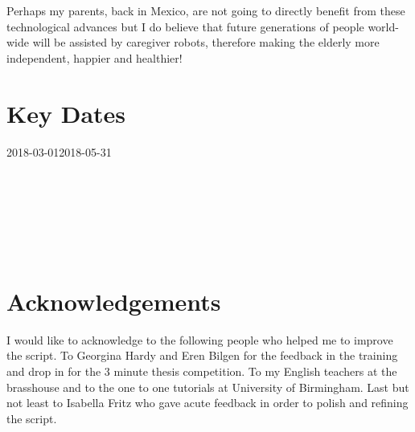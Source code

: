 \documentclass[12pt]{article}
\begin{document}
Perhaps my parents, back in Mexico, are not going to directly benefit 
from these technological advances 
but I do believe that 
future generations of people world-wide
will be assisted by caregiver robots,
therefore making the elderly more independent, happier and healthier!


\newpage



\section*{Key Dates} 

\begin{ganttchart}[
	hgrid,
	vgrid,
	x unit=1mm,
	time slot format=isodate-yearmonth
	]{2018-03-01}{2018-05-31}
 \\
 \\
 \\
 \\

 \\
 \\
 \\
\end{ganttchart}



\section*{Acknowledgements}

I would like to acknowledge to the following people
who helped me to improve the script.
To Georgina Hardy and Eren Bilgen for the feedback in the training and drop in for 
the 3 minute thesis competition. To my English teachers at the brasshouse and to 
the one to one tutorials at University of Birmingham. 
Last but not least to Isabella Fritz who gave acute feedback 
in order to polish and refining the script.

\end{document}
